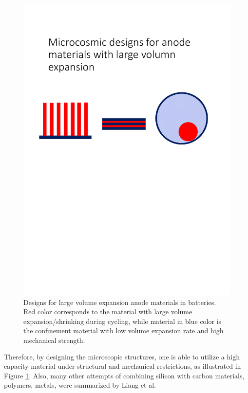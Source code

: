 \begin{figure}  
\centering
\includegraphics[width=\textwidth]{figures/figure1_silibdesign}
\caption[Designs for large volume expansion anode materials]{Designs for large volume expansion anode materials in batteries. Red color corresponds to the material with large volume expansion/shrinking during cycling, while material in blue color is the confinement material with low volume expansion rate and high mechanical strength. 
\label{fig:1silibdesign}}
\end{figure}
 
Therefore, by designing the microscopic structures, one is able to utilize a high capacity material under structural and mechanical restrictions, as illustrated in Figure \ref{fig:1silibdesign}. Also, many other attempts of combining silicon with carbon materials,  polymers,  metals, were summarized by Liang et al.\cite{Liang2014} 
 
